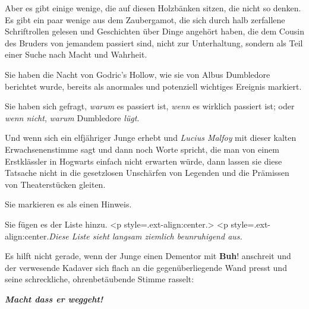 Aber es gibt einige wenige, die auf diesen Holzbänken sitzen, die nicht so
denken. Es gibt ein paar wenige aus dem Zaubergamot, die sich durch halb
zerfallene Schriftrollen gelesen und Geschichten über Dinge angehört haben, die
dem Cousin des Bruders von jemandem passiert sind, nicht zur Unterhaltung,
sondern als Teil einer Suche nach Macht und Wahrheit.

Sie haben die Nacht von Godric's Hollow, wie sie von Albus Dumbledore berichtet
wurde, bereits als anormales und potenziell wichtiges Ereignis markiert.

Sie haben sich gefragt, \emph{warum} es passiert ist, \emph{wenn} es wirklich
passiert ist; oder \emph{wenn nicht}, \emph{warum} Dumbledore \emph{lügt}.

Und wenn sich ein elfjähriger Junge erhebt und \emph{\glqq{}Lucius Malfoy\grqq{}
} mit dieser kalten Erwachsenenstimme sagt und dann noch Worte spricht, die man
von einem Erstklässler in Hogwarts einfach nicht erwarten würde, dann lassen sie
diese Tatsache nicht in die gesetzlosen Unschärfen von Legenden und die
Prämissen von Theaterstücken gleiten.

Sie markieren es als einen Hinweis.


Sie fügen es der Liste hinzu.   <p
style=\grqq{}.ext-align:center\grqq{}.> <p
style=\grqq{}.ext-align:center\grqq{}.\emph{Diese Liste sieht langsam ziemlich
beunruhigend aus.}


Es hilft nicht gerade, wenn der Junge einen Dementor mit \glqq{}
\textbf{Buh}!\grqq{} anschreit und der verwesende Kadaver sich flach an die
gegenüberliegende Wand presst und seine schreckliche, ohrenbetäubende Stimme
rasselt:

\textbf{\emph{\glqq{}Macht dass er
weggeht!\grqq{}} }

